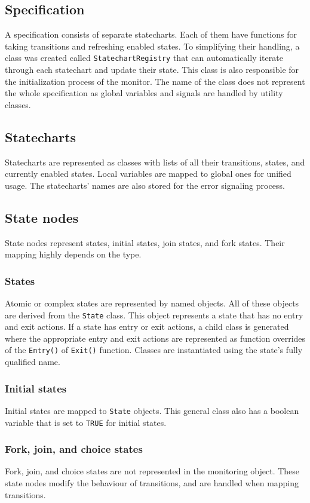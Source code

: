 {  \subsection{Specification}
A specification consists of separate statecharts. Each of them have functions for taking transitions and refreshing enabled states. To simplifying their handling, a class was created called \verb!StatechartRegistry! that can automatically iterate through each statechart and update their state. This class is also responsible for the initialization process of the monitor. The name of the class does not represent the whole specification as global variables and signals are handled by utility classes.
  \subsection{Statecharts}
Statecharts are represented as classes with lists of all their transitions, states, and currently enabled states. Local variables are mapped to global ones for unified usage. The statecharts' names are also stored for the error signaling process.
  \subsection{State nodes}
State nodes represent states, initial states, join states, and fork states. Their mapping highly depends on the type.
    \subsubsection{States}
Atomic or complex states are represented by named objects. All of these objects are derived from the \verb!State! class. This object represents a state that has no entry and exit actions. If a state has entry or exit actions, a child class is generated where the appropriate entry and exit actions are represented as function overrides of the \verb!Entry()! of \verb!Exit()! function. Classes are instantiated using the state's fully qualified name.
    \subsubsection{Initial states}
Initial states are mapped to \verb!State! objects. This general class also has a boolean variable that is set to \verb!TRUE! for initial states.
    \subsubsection{Fork, join, and choice states}
Fork, join, and choice states are not represented in the monitoring object. These state nodes modify the behaviour of transitions, and are handled when mapping transitions.
}
